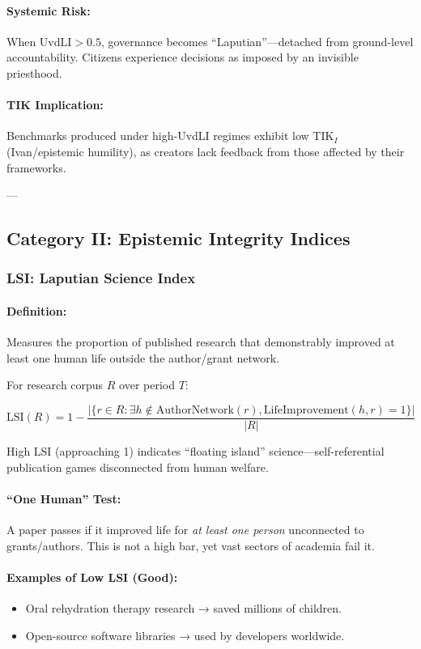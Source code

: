 \documentclass[11pt,a4paper]{article}
\theoremstyle{definition}
\theoremstyle{remark}
\begin{document}
\paragraph{Systemic Risk:}
When $\text{UvdLI} > 0.5$, governance becomes ``Laputian''—detached from ground-level accountability. Citizens experience decisions as imposed by an invisible priesthood.

\paragraph{TIK Implication:}
Benchmarks produced under high-UvdLI regimes exhibit low $\text{TIK}_I$ (Ivan/epistemic humility), as creators lack feedback from those affected by their frameworks.

---

\subsection{Category II: Epistemic Integrity Indices}

\subsubsection{LSI: Laputian Science Index}

\paragraph{Definition:}
Measures the proportion of published research that demonstrably improved at least one human life outside the author/grant network.

For research corpus $R$ over period $T$:

\[
\text{LSI}(R) = 1 - \frac{|\{r \in R : \exists h \notin \text{AuthorNetwork}(r), \text{LifeImprovement}(h, r) = 1\}|}{|R|}
\]

High LSI (approaching 1) indicates ``floating island'' science—self-referential publication games disconnected from human welfare.

\paragraph{``One Human'' Test:}
A paper passes if it improved life for \textit{at least one person} unconnected to grants/authors. This is not a high bar, yet vast sectors of academia fail it.

\paragraph{Examples of Low LSI (Good):}
\begin{itemize}
\item Oral rehydration therapy research → saved millions of children.
\item Open-source software libraries → used by developers worldwide.
\end{itemize}
\end{document}
